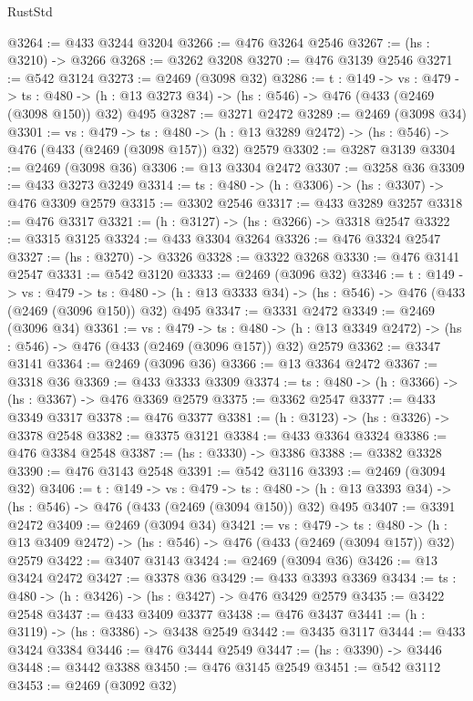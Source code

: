 \begin{lexlean}{RustStd}
\begin{coremodule}
@3264 := @433 @3244 @3204
@3266 := @476 @3264 @2546
@3267 := (hs : @3210) -> @3266
@3268 := @3262 @3208
@3270 := @476 @3139 @2546
@3271 := @542 @3124
@3273 := @2469 (@3098 @32)
@3286 := {t : @149} ->
  {vs : @479} ->
  {ts : @480} -> (h : @13 @3273 @34) -> (hs : @546) -> @476 (@433 (@2469 (@3098 @150)) @32) @495
@3287 := @3271 @2472
@3289 := @2469 (@3098 @34)
@3301 := {vs : @479} ->
  {ts : @480} -> (h : @13 @3289 @2472) -> (hs : @546) -> @476 (@433 (@2469 (@3098 @157)) @32) @2579
@3302 := @3287 @3139
@3304 := @2469 (@3098 @36)
@3306 := @13 @3304 @2472
@3307 := @3258 @36
@3309 := @433 @3273 @3249
@3314 := {ts : @480} -> (h : @3306) -> (hs : @3307) -> @476 @3309 @2579
@3315 := @3302 @2546
@3317 := @433 @3289 @3257
@3318 := @476 @3317
@3321 := (h : @3127) -> (hs : @3266) -> @3318 @2547
@3322 := @3315 @3125
@3324 := @433 @3304 @3264
@3326 := @476 @3324 @2547
@3327 := (hs : @3270) -> @3326
@3328 := @3322 @3268
@3330 := @476 @3141 @2547
@3331 := @542 @3120
@3333 := @2469 (@3096 @32)
@3346 := {t : @149} ->
  {vs : @479} ->
  {ts : @480} -> (h : @13 @3333 @34) -> (hs : @546) -> @476 (@433 (@2469 (@3096 @150)) @32) @495
@3347 := @3331 @2472
@3349 := @2469 (@3096 @34)
@3361 := {vs : @479} ->
  {ts : @480} -> (h : @13 @3349 @2472) -> (hs : @546) -> @476 (@433 (@2469 (@3096 @157)) @32) @2579
@3362 := @3347 @3141
@3364 := @2469 (@3096 @36)
@3366 := @13 @3364 @2472
@3367 := @3318 @36
@3369 := @433 @3333 @3309
@3374 := {ts : @480} -> (h : @3366) -> (hs : @3367) -> @476 @3369 @2579
@3375 := @3362 @2547
@3377 := @433 @3349 @3317
@3378 := @476 @3377
@3381 := (h : @3123) -> (hs : @3326) -> @3378 @2548
@3382 := @3375 @3121
@3384 := @433 @3364 @3324
@3386 := @476 @3384 @2548
@3387 := (hs : @3330) -> @3386
@3388 := @3382 @3328
@3390 := @476 @3143 @2548
@3391 := @542 @3116
@3393 := @2469 (@3094 @32)
@3406 := {t : @149} ->
  {vs : @479} ->
  {ts : @480} -> (h : @13 @3393 @34) -> (hs : @546) -> @476 (@433 (@2469 (@3094 @150)) @32) @495
@3407 := @3391 @2472
@3409 := @2469 (@3094 @34)
@3421 := {vs : @479} ->
  {ts : @480} -> (h : @13 @3409 @2472) -> (hs : @546) -> @476 (@433 (@2469 (@3094 @157)) @32) @2579
@3422 := @3407 @3143
@3424 := @2469 (@3094 @36)
@3426 := @13 @3424 @2472
@3427 := @3378 @36
@3429 := @433 @3393 @3369
@3434 := {ts : @480} -> (h : @3426) -> (hs : @3427) -> @476 @3429 @2579
@3435 := @3422 @2548
@3437 := @433 @3409 @3377
@3438 := @476 @3437
@3441 := (h : @3119) -> (hs : @3386) -> @3438 @2549
@3442 := @3435 @3117
@3444 := @433 @3424 @3384
@3446 := @476 @3444 @2549
@3447 := (hs : @3390) -> @3446
@3448 := @3442 @3388
@3450 := @476 @3145 @2549
@3451 := @542 @3112
@3453 := @2469 (@3092 @32)

\end{coremodule}
\end{lexlean}
